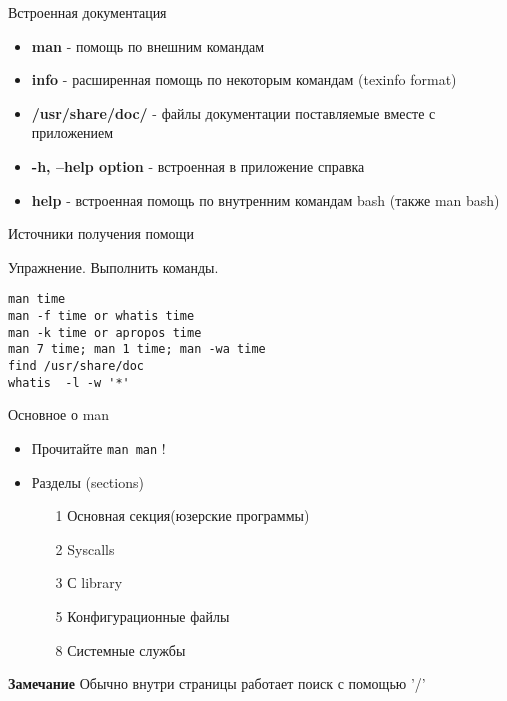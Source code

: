 \begin{frame}[fragile]{Встроенная документация}
\begin{itemize}
    \item \textbf{man} - помощь по внешним командам
    \pause
    \item \textbf{info} - расширенная помощь по некоторым командам (texinfo format)
    \pause
    \item \textbf{/usr/share/doc/} - файлы документации поставляемые вместе с приложением
    \item \textbf{-h, --help option} - встроенная в приложение справка
    \item \textbf{help} - встроенная помощь по внутренним командам bash (также man bash)
\end{itemize}
\end{frame}
\begin{frame}[fragile]{Источники получения помощи}
     \begin{block}{Упражнение. Выполнить команды.}
        \begin{lstlisting}
man time
man -f time or whatis time
man -k time or apropos time
man 7 time; man 1 time; man -wa time
find /usr/share/doc
whatis  -l -w '*'
        \end{lstlisting}
    \end{block}
\end{frame}
\begin{frame}[fragile]{Основное о man}
		\begin{itemize}
			\item Прочитайте {\tt man man} !
			\item Разделы (sections)
				\begin{itemize}
					\item[1] Основная секция(юзерские программы)
					\item[2] Syscalls
					\item[3] С library
					\item[5] Конфигурационные файлы
					\item[8] Системные службы
				\end{itemize}
		\end{itemize}
	  \textbf{Замечание}
	  Обычно внутри страницы работает поиск с помощью '/'
	
\end{frame}


